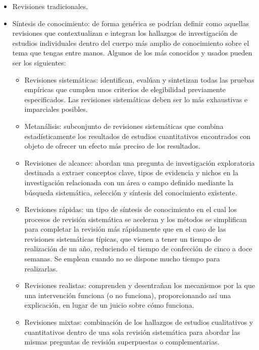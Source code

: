 \begin{itemize}
    \item Revisiones tradicionales. 
    \item Síntesis de conocimiento: de forma genérica se podrían definir como aquellas revisiones que contextualizan e integran los hallazgos de investigación de estudios individuales dentro del cuerpo más amplio de conocimiento sobre el tema que tengas entre manos. Algunos de los más conocidos y usados pueden ser los siguientes:
    \begin{itemize}
        \item Revisiones sistemáticas: identifican, evalúan y sintetizan todas las pruebas empíricas que cumplen unos criterios de elegibilidad previamente especificados. Las revisiones sistemáticas deben ser lo más exhaustivas e imparciales posibles.
        
        \item Metanálisis: subconjunto de revisiones sistemáticas que combina estadísticamente los resultados de estudios cuantitativos encontrados con objeto de ofrecer un efecto más preciso de los resultados.
        
        \item Revisiones de alcance: abordan una pregunta de investigación exploratoria destinada a extraer conceptos clave, tipos de evidencia y nichos en la investigación relacionada con un área o campo definido mediante la búsqueda sistemática, selección y síntesis del conocimiento existente.
        
        \item Revisiones rápidas: un tipo de síntesis de conocimiento en el cual los procesos de revisión sistemática se aceleran y los métodos se simplifican para completar la revisión más rápidamente que en el caso de las revisiones sistemáticas típicas, que vienen a tener un tiempo de realización de un año, reduciendo el tiempo de confección de cinco a doce semanas. Se emplean cuando no se dispone mucho tiempo para realizarlas.
        
        \item Revisiones realistas: comprenden y desentrañan los mecanismos por la que una intervención funciona (o no funciona), proporcionando así una explicación, en lugar de un juicio sobre cómo funciona.

        \item Revisiones mixtas: combinación de los hallazgos de estudios cualitativos y cuantitativos dentro de una sola revisión sistemática para abordar las mismas preguntas de revisión superpuestas o complementarias.
        

\end{itemize}
\end{itemize}

